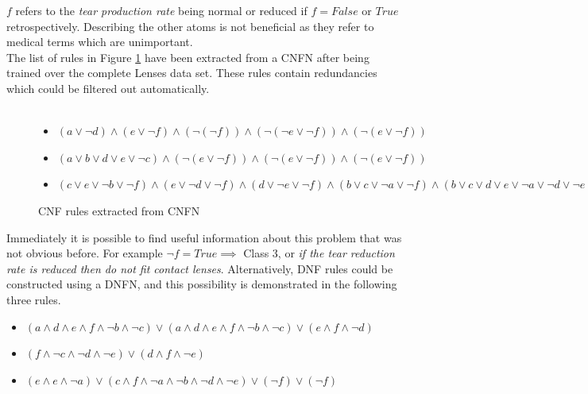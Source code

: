 \noindent
\begin{minipage}[t]{0.45\textwidth}
$f$ refers to the \textit{tear production rate} being normal or reduced if $f = False$ or $True$ retrospectively. Describing the other atoms is not beneficial as they refer to medical terms which are unimportant.\\

The list of rules in Figure \ref{fig:lenses-cnfn-rules} have been extracted from a CNFN after being trained over the complete Lenses data set. These rules contain redundancies which could be filtered out automatically.\\ \\
\end{minipage}
\hspace{0.05\textwidth}
\begin{minipage}[t]{0.5\textwidth}
\begin{figure}[H]
	\begin{itemize}
		\item {} $(a \lor \lnot d) \land (e \lor \lnot f) \land (\lnot ( \lnot f )) \land (\lnot (\lnot e \lor \lnot f)) \land (\lnot(e \lor \lnot f))$
		\item {} $(a \lor b \lor d \lor e \lor \lnot c) \land (\lnot(e \lor \lnot f)) \land (\lnot(e \lor \lnot f)) \land (\lnot(e \lor \lnot f))$
		\item {} $(c \lor e \lor \lnot b \lor \lnot f) \land (e \lor \lnot d \lor \lnot f) \land (d \lor \lnot e \lor \lnot f) \land (b \lor c \lor \lnot a \lor \lnot f) \land (b \lor c \lor d \lor e \lor \lnot a \lor \lnot d \lor \lnot e \lor \lnot f) $
	\end{itemize}
	\caption{CNF rules extracted from CNFN}
	\label{fig:lenses-cnfn-rules}
\end{figure}
\end{minipage}

Immediately it is possible to find useful information about this problem that was not obvious before. For example $\lnot f = True \implies $ Class 3, or \textit{if the tear reduction rate is reduced then do not fit contact lenses}. Alternatively, DNF rules could be constructed using a DNFN, and this possibility is demonstrated in the following three rules.

\begin{itemize}
	\item {} $(a \land d \land e \land f \land \lnot b \land \lnot c) \lor (a \land d \land e \land f \land \lnot b \land \lnot c) \lor (e \land f \land \lnot d)$
	\item {} $(f \land \lnot c \land \lnot d \land \lnot e) \lor (d \land f \land \lnot e)$
	\item {} $(e \land e \land \lnot a) \lor (c \land f \land \lnot a \land \lnot b \land \lnot d \land \lnot e) \lor (\lnot f) \lor (\lnot f)$
\end{itemize}

